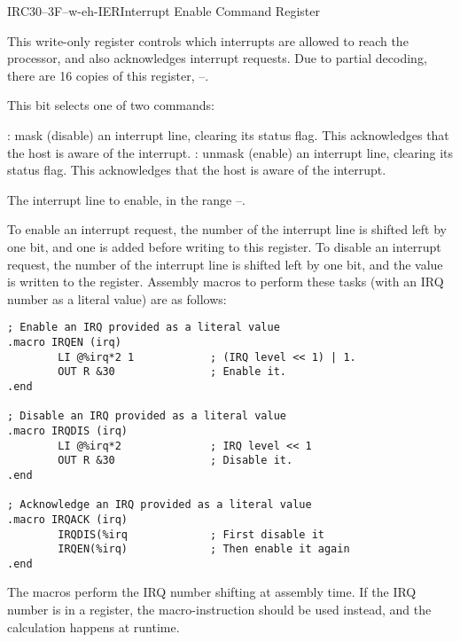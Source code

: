\begin{ioport}{IRC}{30–3F}{--w-eh-}{IER}{Interrupt Enable Command Register}

  This write-only register controls which interrupts are allowed to reach the
  processor, and also acknowledges interrupt requests. Due to partial decoding,
  there are 16 copies of this register, –.

  \begin{cbitfield}
  \end{cbitfield}

  \begin{description}
     This bit selects one of two commands:
    \begin{description}
      : mask (disable) an interrupt line, clearing its status flag. This
      acknowledges that the host is aware of the interrupt.
      : unmask (enable) an interrupt line, clearing its status flag. This
      acknowledges that the host is aware of the interrupt.
    \end{description}

     The interrupt line to enable, in the range –.
  \end{description}

  To enable an interrupt request, the number of the interrupt line is shifted
  left by one bit, and one is added before writing to this register. To disable
  an interrupt request, the number of the interrupt line is shifted left by one
  bit, and the value is written to the register. Assembly macros to perform
  these tasks (with an IRQ number as a literal value) are as follows:

\begin{lstlisting}[language=cftasm]
; Enable an IRQ provided as a literal value
.macro IRQEN (irq)
        LI @%irq*2 1            ; (IRQ level << 1) | 1.
        OUT R &30               ; Enable it.
.end

; Disable an IRQ provided as a literal value
.macro IRQDIS (irq)
        LI @%irq*2              ; IRQ level << 1
        OUT R &30               ; Disable it.
.end

; Acknowledge an IRQ provided as a literal value
.macro IRQACK (irq)
        IRQDIS(%irq             ; First disable it
        IRQEN(%irq)             ; Then enable it again
.end
\end{lstlisting}

The macros perform the IRQ number shifting at assembly time. If the IRQ number
is in a register, the  macro-instruction should be used instead, and
the calculation happens at runtime.
  
\end{ioport}

